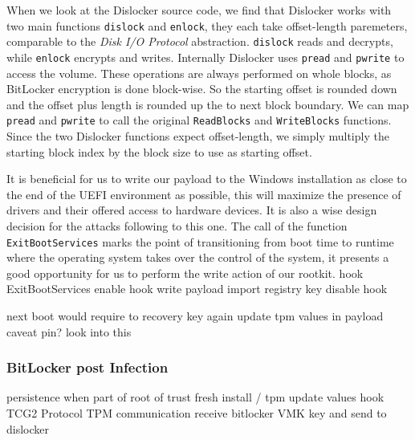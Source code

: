 When we look at the Dislocker source code, we find that Dislocker works with two main functions \lstinline{dislock} and \lstinline{enlock}, they each take offset-length paremeters, comparable to the \emph{Disk I/O Protocol} abstraction. \lstinline{dislock} reads and decrypts, while \lstinline{enlock} encrypts and writes. Internally Dislocker uses \lstinline{pread} and \lstinline{pwrite} to access the volume. These operations are always performed on whole blocks, as BitLocker encryption is done block-wise. So the starting offset is rounded down and the offset plus length is rounded up the to next block boundary. We can map \lstinline{pread} and \lstinline{pwrite} to call the original \lstinline{ReadBlocks} and \lstinline{WriteBlocks} functions. Since the two Dislocker functions expect offset-length, we simply multiply the starting block index by the block size to use as starting offset.


It is beneficial for us to write our payload to the Windows installation as close to the end of the \ac{UEFI} environment as possible, this will maximize the presence of drivers and their offered access to hardware devices. It is also a wise design decision for the attacks following to this one. The call of the function \lstinline{ExitBootServices} marks the point of transitioning from boot time to runtime where the operating system takes over the control of the system, it presents a good opportunity for us to perform the write action of our rootkit.
\cite{exitbootservices-hooking}
hook ExitBootServices
enable hook
write payload
import registry key
disable hook

next boot would require to recovery key again
update tpm values in payload
\cite{microsoft-bitlocker-manage-bde}
caveat pin? look into this


\subsubsection{BitLocker post Infection}
persistence when part of root of trust
fresh install / tpm update values
hook \ac{TCG2} Protocol \cite[6.7.3]{tcg-efi-protocol-spec}
\ac{TPM} communication
receive bitlocker \ac{VMK} key and send to dislocker
\cite{bde-format-spec}
\cite{tpm-sniffing}

